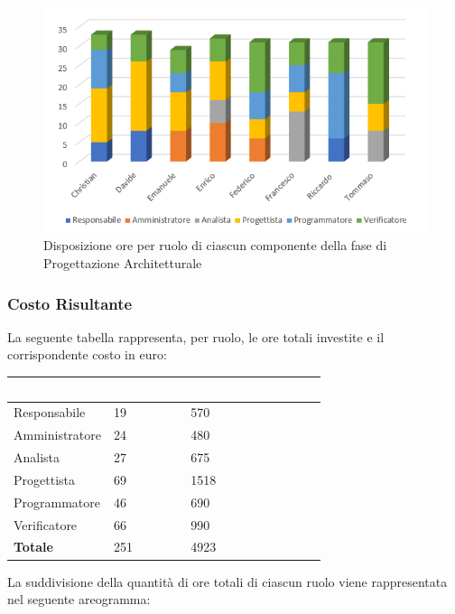 \begin{figure}[h!]
	\centering
	\caption{Disposizione ore per ruolo di ciascun componente della fase di Progettazione Architetturale}
	\includegraphics[scale=3]{sezioni/Istogrammi/IstogrammaProgettArchitetturale.png}
\end{figure}

\subsubsection{Costo Risultante}
La seguente tabella rappresenta, per ruolo, le ore totali investite e il corrispondente costo in euro:
{
\renewcommand{\arraystretch}{2}
\centering
\begin{table}[h]
\caption{Tabella del costo risultante della Progettazione Architetturale}
\begin{longtable}{ C{3cm} C{2cm} C{4cm}}
	\textcolor{white}{\textbf{Ruolo}} & 
	\textcolor{white}{\textbf{Totale ore}} & 
	\textcolor{white}{\textbf{Costo ruolo in euro}}\\	
\endhead
        
        Responsabile & 19 & 570 \\
        Amministratore & 24 & 480 \\
        Analista & 27 & 675 \\
        Progettista & 69 & 1518 \\
        Programmatore & 46 & 690 \\
        Verificatore & 66 & 990 \\
        \textbf{Totale} & 251 & 4923 \\	
        	
	\end{longtable}
\end{table}
}
\newline
La suddivisione della quantità di ore totali di ciascun ruolo viene rappresentata nel seguente areogramma:

